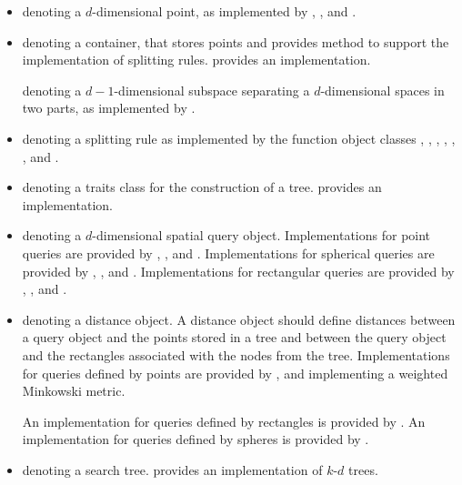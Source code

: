 \begin{itemize}

\item 
{} 
denoting a $d$-dimensional point, as implemented by 
, , and .

\item
{} denoting a container, that stores points and
provides method to support the implementation of splitting rules. 
 provides an implementation.


 denoting a $d-1$-dimensional
subspace separating a $d$-dimensional spaces in two parts,
as implemented by .

\item 
{} denoting a splitting rule as implemented by the function object classes 
,
,
,
,
,
, and
.

\item
{} denoting a traits class for the construction of a tree.
 provides an implementation. 

\item
{} denoting a $d$-dimensional spatial query object. Implementations
for point queries are provided by
, , and .
Implementations
for spherical queries are provided by
, , and .
Implementations
for rectangular queries are provided by
, , and .

\item
{} denoting a distance object. A distance object should define distances between a query object
and the points stored in a tree and between the query object and the rectangles associated with the nodes from the tree.
Implementations for queries defined by points are provided
by , and
 implementing 
a weighted Minkowski metric.

An implementation for queries defined by rectangles is provided by
.
An implementation for queries defined by spheres is provided by
.

\item
{} denoting a search tree.  
 provides an implementation of $k$-$d$ trees.

\end{itemize}

